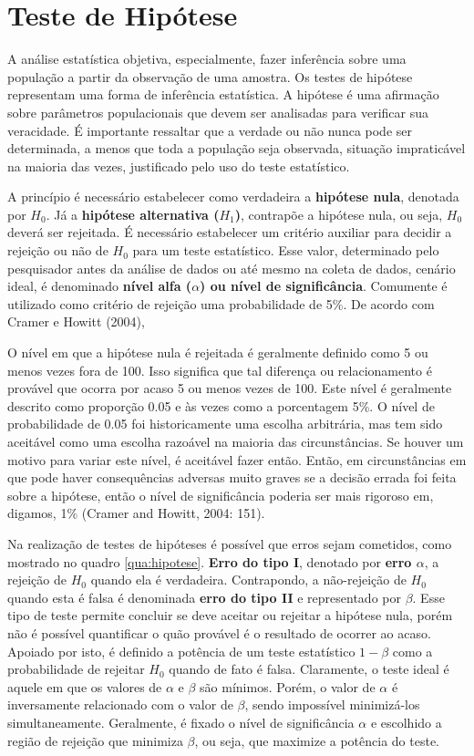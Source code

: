 \section{Teste de Hipótese}
A análise estatística objetiva, especialmente, fazer inferência sobre uma população a partir da observação de uma amostra. Os testes de hipótese representam uma forma de inferência estatística. A hipótese é uma afirmação sobre parâmetros populacionais que devem ser analisadas para verificar sua veracidade. É importante ressaltar que a verdade ou não nunca pode ser determinada, a menos que toda a população seja observada, situação impraticável na maioria das vezes, justificado pelo uso do teste estatístico.  

A princípio é necessário estabelecer como verdadeira a \textbf{hipótese nula}, denotada por \textbf{$H_0$}. Já a \textbf{hipótese alternativa ($H_1$)}, contrapõe a hipótese nula, ou seja, $H_0$ deverá ser rejeitada. É necessário estabelecer um critério auxiliar para decidir a rejeição ou não de $H_0$ para um teste estatístico. Esse valor, determinado pelo pesquisador antes da análise de dados ou até mesmo na coleta de dados, cenário ideal, é denominado \textbf{nível alfa ($\alpha$) ou nível de significância}. Comumente é utilizado como critério de rejeição uma probabilidade de 5\%. De acordo com Cramer e Howitt (2004), 

\begin{citacao}
O nível em que a hipótese nula é rejeitada é geralmente definido como 5 ou menos vezes fora de 100. Isso significa que tal diferença ou relacionamento é provável que ocorra por acaso 5 ou menos vezes de 100. Este nível é geralmente descrito como proporção 0.05 e às vezes como a porcentagem 5\%. O nível de probabilidade de 0.05 foi historicamente uma escolha arbitrária, mas tem sido aceitável como uma escolha razoável na maioria das circunstâncias. Se houver um motivo para variar este nível, é aceitável fazer então. Então, em circunstâncias em que pode haver consequências adversas muito graves se a decisão errada foi feita sobre a hipótese, então o nível de significância poderia ser mais rigoroso em, digamos, 1\% (Cramer and Howitt, 2004: 151). 
\end{citacao}

Na realização de testes de hipóteses é possível que erros sejam cometidos, como mostrado no quadro \ref{qua:hipotese}. \textbf{Erro do tipo I}, denotado por \textbf{erro $\alpha$}, a rejeição de $H_0$ quando ela é verdadeira. Contrapondo, a não-rejeição de $H_0$ quando esta é falsa é denominada \textbf{erro do tipo II} e representado por \textbf{$\beta$}.  Esse tipo de teste permite concluir se deve aceitar ou rejeitar a hipótese nula, porém não é possível quantificar o quão provável é o resultado de ocorrer ao acaso. Apoiado por isto, é definido a potência de um teste estatístico $1-\beta$ como a probabilidade de rejeitar $H_0$ quando de fato é falsa. Claramente, o teste ideal é aquele em que os valores de $\alpha$ e $\beta$ são mínimos. Porém, o valor de $\alpha$ é inversamente relacionado com o valor de $\beta$, sendo impossível minimizá-los simultaneamente. Geralmente, é fixado o nível de significância $\alpha$ e escolhido a região de rejeição que minimiza $\beta$, ou seja, que maximize a potência do teste. 


